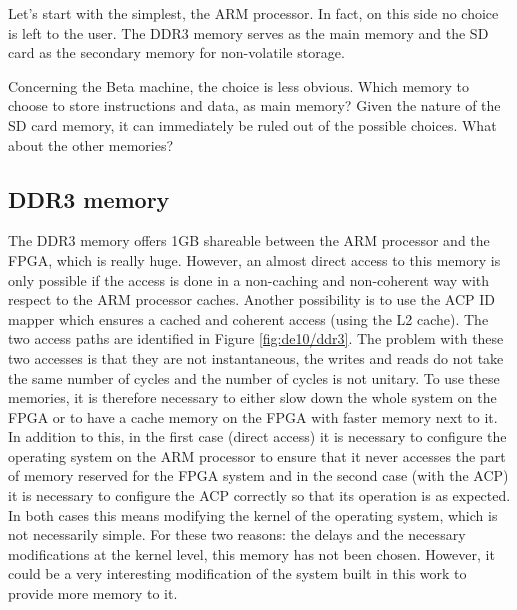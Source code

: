 Let's start with the simplest, the ARM processor. In fact, on this side no choice is left to the 
user. The DDR3 memory serves as the main memory and the SD card as the secondary memory for 
non-volatile storage. 

Concerning the Beta machine, the choice is less obvious.  Which memory to choose to store 
instructions and data, as main memory?  Given the nature of the SD card memory, it can immediately be 
ruled out of the possible choices. What about the other memories?

\subsection{DDR3 memory}

The DDR3 memory offers 1GB 
shareable between the ARM processor and the FPGA,
which is really huge. However, an almost 
direct access to this memory is only possible if the access is done in a non-caching and 
non-coherent way with respect to the ARM processor caches. Another possibility is to use the ACP 
ID mapper which ensures a cached and coherent access (using the L2 cache). The two access paths 
are identified in Figure \ref{fig:de10/ddr3}. The problem with these two accesses is that they are 
not instantaneous, the writes and reads do not take the same number of cycles and the number of 
cycles is not unitary. To use these memories, it is therefore necessary to either slow down the 
whole system on the FPGA or to have a cache memory on the FPGA with faster memory next to it. In 
addition to this, in the first case (direct access) it is necessary to configure the operating 
system on the ARM processor to ensure that it never accesses the part of memory reserved for the
FPGA system and in the second case (with the ACP) it is necessary to configure the ACP 
correctly so that its operation is as expected. In both cases this means modifying the kernel of the 
operating system, which is not necessarily simple. For these two reasons: the delays and the 
necessary modifications at the kernel level, this memory has not been chosen. However, it could be 
a very interesting modification of the system built in this work to provide more memory to it.

